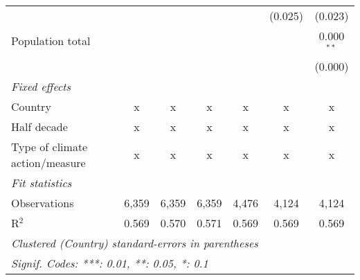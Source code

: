\begin{tabular}{lcccccc}
                                                                          &              &                &                &                & (0.025)        & (0.023)\\   
   Population total                                                       &              &                &                &                &                & 0.000$^{**}$\\   
                                                                          &              &                &                &                &                & (0.000)\\   
   \emph{Fixed effects}\\
   Country                                                                & x            & x              & x              & x              & x              & x\\  
   Half decade                                                            & x            & x              & x              & x              & x              & x\\  
   Type of climate action/measure                                         & x            & x              & x              & x              & x              & x\\  
   \midrule \emph{Fit statistics}\\
   Observations                                                           & 6,359        & 6,359          & 6,359          & 4,476          & 4,124          & 4,124\\  
   R$^2$                                                                  & 0.569        & 0.570          & 0.571          & 0.569          & 0.569          & 0.569\\  
   \midrule
   \multicolumn{7}{l}{\emph{Clustered (Country) standard-errors in parentheses}}\\
   \multicolumn{7}{l}{\emph{Signif. Codes: ***: 0.01, **: 0.05, *: 0.1}}\\
\end{tabular}
\par\endgroup


